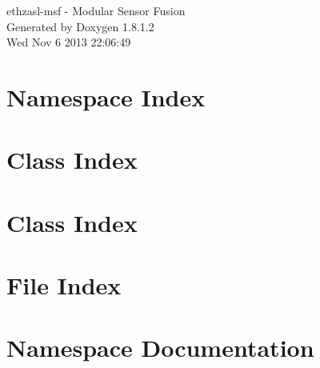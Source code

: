 \documentclass{book}
\begin{document}
\hypersetup{pageanchor=false,citecolor=blue}
\begin{titlepage}
\vspace*{7cm}
\begin{center}
{\Large ethzasl-\/msf -\/ Modular Sensor Fusion }\\
\vspace*{1cm}
{\large Generated by Doxygen 1.8.1.2}\\
\vspace*{0.5cm}
{\small Wed Nov 6 2013 22:06:49}\\
\end{center}
\end{titlepage}
\clearemptydoublepage
{}
\tableofcontents
\clearemptydoublepage
{}
\hypersetup{pageanchor=true,citecolor=blue}
\chapter{Namespace Index}

\chapter{Class Index}

\chapter{Class Index}

\chapter{File Index}

\chapter{Namespace Documentation}











\end{document}
